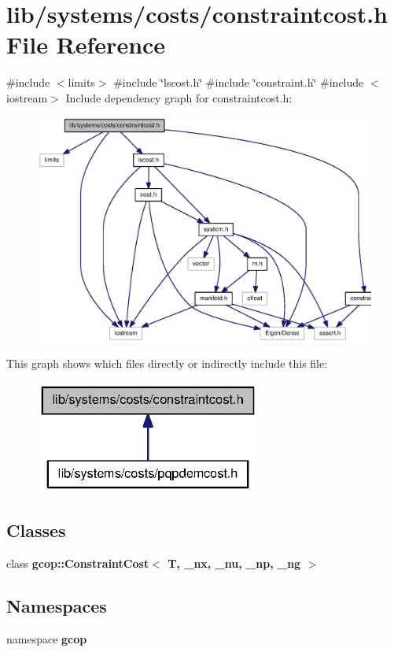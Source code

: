 \section{lib/systems/costs/constraintcost.h \-File \-Reference}
\label{constraintcost_8h}
{\ttfamily \#include $<$limits$>$}\*
{\ttfamily \#include \char`\"{}lscost.\-h\char`\"{}}\*
{\ttfamily \#include \char`\"{}constraint.\-h\char`\"{}}\*
{\ttfamily \#include $<$iostream$>$}\*
\-Include dependency graph for constraintcost.\-h\-:
\nopagebreak
\begin{figure}[H]
\begin{center}
\leavevmode
\includegraphics[width=350pt]{constraintcost_8h__incl}
\end{center}
\end{figure}
\-This graph shows which files directly or indirectly include this file\-:
\nopagebreak
\begin{figure}[H]
\begin{center}
\leavevmode
\includegraphics[width=210pt]{constraintcost_8h__dep__incl}
\end{center}
\end{figure}
\subsection*{\-Classes}
\begin{DoxyCompactItemize}
\item 
class {\bf gcop\-::\-Constraint\-Cost$<$ T, \-\_\-nx, \-\_\-nu, \-\_\-np, \-\_\-ng $>$}
\end{DoxyCompactItemize}
\subsection*{\-Namespaces}
\begin{DoxyCompactItemize}
\item 
namespace {\bf gcop}
\end{DoxyCompactItemize}
